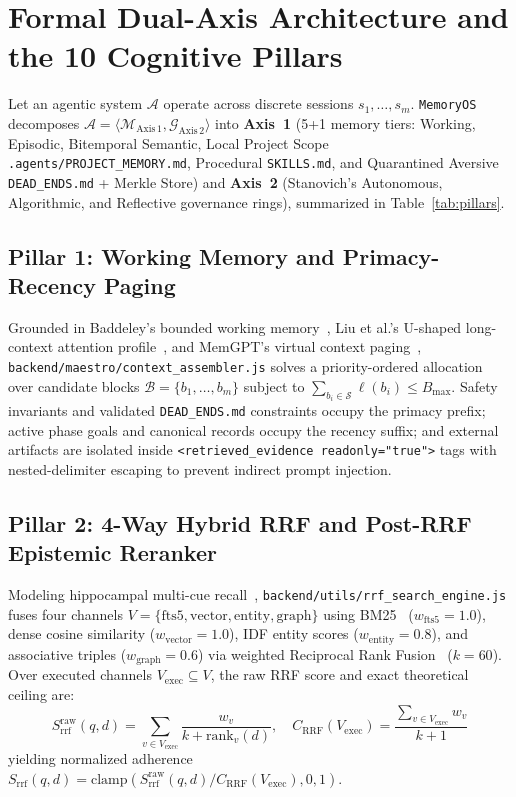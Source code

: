 \documentclass[10pt,twocolumn]{article}
\begin{document}
\section{Formal Dual-Axis Architecture and the 10 Cognitive Pillars}

Let an agentic system $\mathcal{A}$ operate across discrete sessions $s_1, \dots, s_m$. \texttt{MemoryOS} decomposes $\mathcal{A} = \langle \mathcal{M}_{\mathrm{Axis\,1}}, \mathcal{G}_{\mathrm{Axis\,2}} \rangle$ into \textbf{Axis~1} (5+1 memory tiers: Working, Episodic, Bitemporal Semantic, Local Project Scope \texttt{.agents/PROJECT\_MEMORY.md}, Procedural \texttt{SKILLS.md}, and Quarantined Aversive \texttt{DEAD\_ENDS.md} + Merkle Store) and \textbf{Axis~2} (Stanovich's Autonomous, Algorithmic, and Reflective governance rings), summarized in Table~\ref{tab:pillars}.

\subsection{Pillar 1: Working Memory and Primacy-Recency Paging}
Grounded in Baddeley's bounded working memory~\cite{E01,E02}, Liu et al.'s U-shaped long-context attention profile~\cite{E03}, and MemGPT's virtual context paging~\cite{E04}, \texttt{backend/maestro/context\_assembler.js} solves a priority-ordered allocation over candidate blocks $\mathcal{B} = \{b_1, \dots, b_m\}$ subject to $\sum_{b_i \in \mathcal{S}} \ell(b_i) \le B_{\max}$. Safety invariants and validated \texttt{DEAD\_ENDS.md} constraints occupy the primacy prefix; active phase goals and canonical records occupy the recency suffix; and external artifacts are isolated inside \texttt{<retrieved\_evidence readonly="true">} tags with nested-delimiter escaping to prevent indirect prompt injection.

\subsection{Pillar 2: 4-Way Hybrid RRF and Post-RRF Epistemic Reranker}
Modeling hippocampal multi-cue recall~\cite{E05}, \texttt{backend/utils/rrf\_search\_engine.js} fuses four channels $V = \{\text{fts5}, \text{vector}, \text{entity}, \text{graph}\}$ using BM25~\cite{E06} ($w_{\text{fts5}}=1.0$), dense cosine similarity ($w_{\text{vector}}=1.0$), IDF entity scores ($w_{\text{entity}}=0.8$), and associative triples ($w_{\text{graph}}=0.6$) via weighted Reciprocal Rank Fusion~\cite{E07} ($k = 60$). Over executed channels $V_{\mathrm{exec}} \subseteq V$, the raw RRF score and exact theoretical ceiling are:
\begin{equation}
S_{\mathrm{rrf}}^{\mathrm{raw}}(q,d) = \sum_{v \in V_{\mathrm{exec}}} \frac{w_v}{k + \mathrm{rank}_v(d)}, \quad
C_{\mathrm{RRF}}(V_{\mathrm{exec}}) = \frac{\sum_{v \in V_{\mathrm{exec}}} w_v}{k + 1}
\end{equation}
yielding normalized adherence $S_{\mathrm{rrf}}(q,d) = \mathrm{clamp}(S_{\mathrm{rrf}}^{\mathrm{raw}}(q,d) / C_{\mathrm{RRF}}(V_{\mathrm{exec}}), 0, 1)$.
\end{document}
